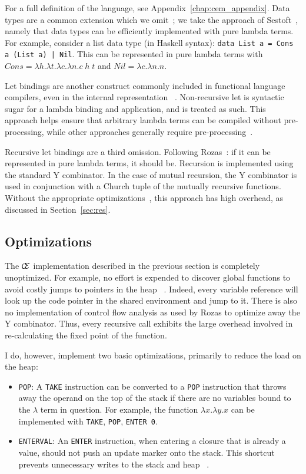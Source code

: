 For a full definition of the language, see Appendix~\ref{chap:cem_appendix}.
Data types are a common extension which we omit~\cite{jonesstg,boquist1997grin};
we take the approach of Sestoft~\cite{sestoft}, namely that data types can be
efficiently implemented with pure lambda terms. For example, consider a list
data type (in Haskell syntax): \texttt{data List a = Cons a (List a) | Nil}.
This can be represented in pure lambda terms with $\mathit{Cons} = \lambda
h.\lambda t.\lambda c.\lambda n.c \; h \; t$ and $\mathit{Nil} = \lambda
c.\lambda n.n$. 

Let bindings are another construct commonly included in functional
language compilers, even in the internal representation
~\cite{boquist1997grin,jonesstg}.  Non-recursive let is syntactic sugar for a
lambda binding and application, and is treated as such. This approach helps
ensure that arbitrary lambda terms can be compiled without pre-processing, while
other approaches generally require pre-processing~\cite{sestoft,TIM}.

Recursive let bindings are a third omission. Following
Rozas~\cite{rozas1992taming}: if it can be represented in pure lambda terms, it
should be. Recursion is implemented using the standard Y combinator. In the
case of mutual recursion, the Y combinator is used in conjunction with a Church
tuple of the mutually recursive functions. Without the appropriate
optimizations~\cite{rozas1992taming}, this approach has high overhead, as
discussed in Section~\ref{sec:res}.

\subsection{Optimizations}

The $\mathcal{C} \mskip -4mu \mathcal{E}$ implementation described in the previous section is 
completely unoptimized. For example, no effort is expended to
discover global functions to avoid costly jumps to pointers in the heap
~\cite{jonesstg}. Indeed, every variable reference will look up the code pointer
in the shared environment and jump to it. There is also no implementation of 
control flow analysis as used by Rozas to optimize away the Y combinator.  Thus,
every recursive call exhibits the large overhead involved in re-calculating the
fixed point of the function.  

I do, however, implement two basic optimizations, primarily to reduce the load
on the heap:

\begin{itemize}
\item \texttt{POP}: A \texttt{TAKE} instruction can be converted to a \texttt{POP}
instruction that throws away the operand on the top of the stack if there are no
variables bound to the $\lambda$ term in question. For example, the function
$\lambda x.\lambda y.x$ can be implemented with \texttt{TAKE}, \texttt{POP},
\texttt{ENTER 0}.  
\item \texttt{ENTERVAL}: An \texttt{ENTER} instruction, when entering a
closure that is already a value, should not push an update marker onto the
stack. This shortcut prevents unnecessary writes to the stack and heap
~\cite{jonesstg,lkm,sestoft}.  
\end{itemize}

